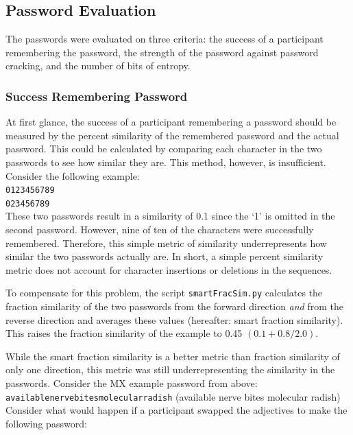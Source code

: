 \documentclass{article}
\begin{document}
\subsection*{Password Evaluation}
The passwords were evaluated on three criteria: the success of a participant remembering the password, the strength of the password against password cracking, and the number of bits of entropy.
\subsubsection*{Success Remembering Password}
At first glance, the success of a participant remembering a password should be measured by the percent similarity of the remembered password and the actual password. This could be calculated by comparing each character in the two passwords to see how similar they are. This method, however, is insufficient. Consider the following example:\\


\noindent\texttt{0123456789}\\
\texttt{023456789} \\

These two passwords result in a similarity of 0.1 since the `1' is omitted in the second password. However, nine of ten of the characters were successfully remembered. Therefore, this simple metric of similarity underrepresents how similar the two passwords actually are. In short, a simple percent similarity metric does not account for character insertions or deletions in the sequences.

To compensate for this problem, the script \texttt{smartFracSim.py} calculates the fraction similarity of the two passwords from the forward direction \emph{and} from the reverse direction and averages these values (hereafter: smart fraction similarity). This raises the fraction similarity of the example to 0.45 $(0.1 + 0.8 / 2.0)$.

While the smart fraction similarity is a better metric than fraction similarity of only one direction, this metric was still underrepresenting the similarity in the passwords. Consider the MX example password from above: \\

\noindent \texttt{availablenervebitesmolecularradish} (available nerve bites molecular radish) \\

Consider what would happen if a participant swapped the adjectives to make the following password:\\
\end{document}

